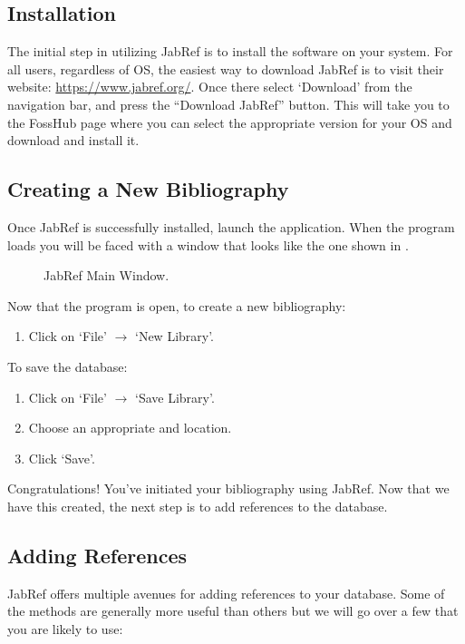 		\subsection{Installation}
			The initial step in utilizing JabRef is to install the software on your system. 
			For all users, regardless of OS, the easiest way to download JabRef is to visit their website: \url{https://www.jabref.org/}.
			Once there select `Download' from the navigation bar, and press the ``Download JabRef'' button. 
			This will take you to the FossHub page where you can select the appropriate version for your OS and download and install it.

		\subsection{Creating a New Bibliography}
			Once JabRef is successfully installed, launch the application. 
			When the program loads you will be faced with a window that looks like the one shown in .
			\begin{figure}[htbp]
				\centering
				\caption{JabRef Main Window.}
				\label{fig:JabRefProgram}
			\end{figure}
			Now that the program is open, to create a new bibliography:
			\begin{enumerate}
				\item Click on `File' \(\rightarrow\) `New Library'.
			\end{enumerate}
			To save the database:
			\begin{enumerate}
				\item Click on `File' \(\rightarrow\) `Save Library'.
				\item Choose an appropriate and location.
				\item Click `Save'.
			\end{enumerate}
			Congratulations! You've initiated your bibliography using JabRef. 
			Now that we have this created, the next step is to add references to the database.

		\subsection{Adding References}
			JabRef offers multiple avenues for adding references to your database.
			Some of the methods are generally more useful than others but we will go over a few that you are likely to use:

